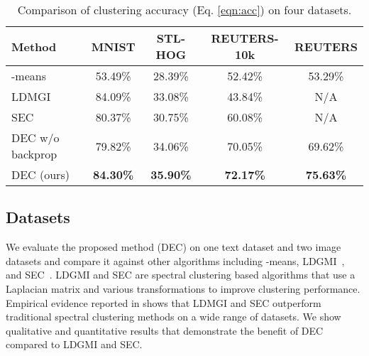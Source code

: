 \documentclass{article}
\begin{document}
\begin{table*}[!ht]
\centering
\caption{Comparison of clustering accuracy (Eq. \ref{eqn:acc}) on four datasets.}
\begin{tabular}{l|c|c|c|c}
Method	& MNIST	& STL-HOG	& REUTERS-10k	& REUTERS \\ \hline \hline
-means	& 53.49\%	& 28.39\%	& 52.42\%	& 53.29\% \\ \hline
LDMGI	& 84.09\%	& 33.08\%	& 43.84\%	& N/A \\ \hline
SEC		& 80.37\%	& 30.75\%	& 60.08\%	& N/A \\ \hline
DEC w/o backprop & 79.82\% & 34.06\% & 70.05\% & 69.62\% \\ \hline
DEC (ours)	& \textbf{84.30\%}	& \textbf{35.90\%}	& \textbf{72.17\%}	& \textbf{75.63\%}
\end{tabular}
\label{table:acc}
\end{table*}

\subsection{Datasets}
We evaluate the proposed method (DEC) on one text dataset and two image datasets and compare it against other algorithms including -means, LDGMI~\citep{yang2010image}, and SEC~\citep{nie2011spectral}.
LDGMI and SEC are spectral clustering based algorithms that use a Laplacian matrix and various transformations to improve clustering performance.
Empirical evidence reported in \citet{yang2010image,nie2011spectral} shows that LDMGI and SEC outperform traditional spectral clustering methods on a wide range of datasets.
We show qualitative and quantitative results that demonstrate the benefit of DEC compared to LDGMI and SEC.
\end{document}
